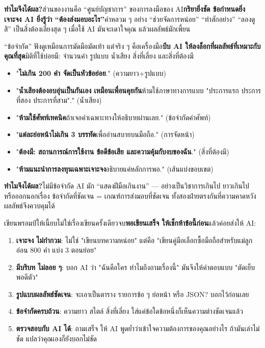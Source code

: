 \textbf{ทำไมจึงได้ผล?}ส่วนของงานคือ “ศูนย์บัญชาการ” ของการลงมือของ AI\textbf{กริยายิ่งชัด ข้อกำหนดยิ่งเจาะจง AI ยิ่งรู้ว่า “ต้องส่งมอบอะไร”}คำหลวม ๆ อย่าง “ช่วยจัดการหน่อย” “ทำสักอย่าง” “ลองดูสิ” เป็นสิ่งต้องเลี่ยงสุด ๆ เมื่อใช้ AI มันจะเดาใจคุณ แล้วผลลัพธ์มักเพี้ยน


“ข้อจำกัด” ฟังดูเหมือนการมัดมือมัดเท้า แต่จริง ๆ คือเครื่องมือ\textbf{บีบ AI ให้ลงล็อกที่ผลลัพธ์ที่เหมาะกับคุณที่สุด}มิติที่ใช้บ่อยมี: จำนวนคำ รูปแบบ น้ำเสียง สิ่งที่เลี่ยง และสิ่งที่ต้องมี


\begin{itemize}
  \item "\textbf{ไม่เกิน 200 คำ จัดเป็นหัวข้อย่อย}." (ความยาว+รูปแบบ)
  \item "\textbf{น้ำเสียงต้องอบอุ่นเป็นกันเอง เหมือนเพื่อนคุยกัน}ห้ามใช้ภาษาทางการแบบ "ประการแรก ประการที่สอง ประการที่สาม"." (น้ำเสียง)
  \item "\textbf{ห้ามใช้ศัพท์เทคนิค}ถ้าเจอคำเฉพาะทางให้อธิบายผ่านเลย." (ข้อจำกัดคำศัพท์)
  \item "\textbf{แต่ละย่อหน้าไม่เกิน 3 บรรทัด}เพื่ออ่านสบายบนมือถือ." (การจัดหน้า)
  \item "\textbf{ต้องมี: สถานการณ์การใช้งาน ข้อดีข้อเสีย และความคุ้มกับงบของฉัน}." (สิ่งที่ต้องมี)
  \item "\textbf{ห้ามแนะนำการลงทุนเฉพาะเจาะจง}อธิบายแค่หลักการพอ." (เส้นแบ่งขอบเขต)
\end{itemize}

\textbf{ทำไมจึงได้ผล?}ไม่มีข้อจำกัด AI มัก “แสดงฝีมือเกินงาน” — อย่างเป็นวิชาการเกินไป ยาวเกินไป หรือออกนอกเรื่อง ข้อจำกัดที่ชัดเจน = เกณฑ์การส่งมอบที่ชัดเจน ทั้งสองฝ่ายตรงกันที่ความคาดหวัง ผลลัพธ์จึงควบคุมได้


เขียนพรอมป์ให้เนี้ยบไม่ใช่เรื่องเขียนครั้งเดียวจบ\textbf{พอเขียนเสร็จ ให้เช็กห้าข้อนี้ก่อน}แล้วค่อยส่งให้ AI:

\begin{enumerate}
  \item \textbf{เจาะจง ไม่กำกวม}: ไม่ใช่ "เขียนบทความหน่อย" แต่คือ "เขียนคู่มือเลือกซื้อมือถือสำหรับแม่ลูกอ่อน 800 คำ แบ่ง 3 ตอนย่อย"
  \item \textbf{มีบริบท ไม่ลอย ๆ}: บอก AI ว่า "ฉันคือใคร ทำไมถึงถามเรื่องนี้" มันจึงให้คำตอบแบบ "ตัดเย็บพอดีตัว"
  \item \textbf{รูปแบบผลลัพธ์ชัดเจน}: จะเอาเป็นตาราง รายการข้อ ๆ ย่อหน้า หรือ JSON? บอกไว้ก่อนเลย
  \item \textbf{ข้อจำกัดครบถ้วน}: ความยาว สไตล์ สิ่งที่เลี่ยง ใส่แค่ข้อใดข้อหนึ่งก็เห็นความต่างชัดเจนแล้ว
  \item \textbf{ตรวจสอบกับ AI ได้}: ถามเสร็จ ให้ AI พูดย้ำว่าเข้าใจความต้องการของคุณอย่างไร ถ้ามันเล่าไม่ชัด แปลว่าคุณเองก็ยังบอกไม่ชัด
\end{enumerate}


